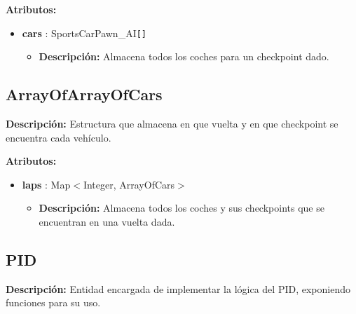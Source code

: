 \bigskip

\textbf{Atributos: }
\begin{itemize}
    \item \textbf{cars} : SportsCarPawn\_AI\verb|[]|
    \begin{itemize}
        \item \textbf{Descripción: }Almacena todos los coches para un checkpoint dado.
    \end{itemize}
\end{itemize}

\subsection{ArrayOfArrayOfCars}
\textbf{Descripción: }Estructura que almacena en que vuelta y en que checkpoint se encuentra cada vehículo.

\bigskip

\textbf{Atributos: }
\begin{itemize}
    \item \textbf{laps} : Map$<$Integer, ArrayOfCars$>$
    \begin{itemize}
        \item \textbf{Descripción: }Almacena todos los coches y sus checkpoints que se encuentran en una vuelta dada.
    \end{itemize}
\end{itemize}


\subsection{PID}
\textbf{Descripción: }Entidad encargada de implementar la lógica del PID, exponiendo funciones para su uso.

\bigskip

